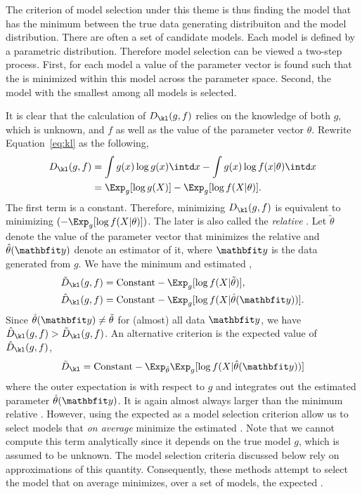The criterion of model selection under this theme is thus finding the model
that has the minimum \kld between the true data generating distribuiton and
the model distribution. There are often a set of candidate models. Each model
is defined by a parametric distribution. Therefore model selection can be
viewed a two-step process. First, for each model a value of the parameter
vector is found such that the \kld is minimized within this model across the
parameter space. Second, the model with the smallest \kld among all models is
selected.

It is clear that the calculation of $D_{\kl}(g,f)$ relies on the knowledge of
both $g$, which is unknown, and $f$ as well as the value of the parameter
vector $\theta$. Rewrite Equation~\eqref{eq:kl} as the following,
\begin{align}
  D_{\kl}(g,f)
  &= \int g(x)\log g(x) \intd x - \int g(x) \log f(x|\theta) \intd x \notag\\
  &= \Exp_g[\log g(X)] - \Exp_g[\log f(X|\theta)].
\end{align}
The first term is a constant. Therefore, minimizing $D_{\kl}(g,f)$ is
equivalent to minimizing $(-\Exp_g[\log f(X|\theta)])$. The later is also
called the \emph{relative} \kldfull. Let $\tilde\theta$ denote the value of
the parameter vector that minimizes the relative \kld and $\hat\theta(\data)$
denote an estimator of it, where $\data$ is the data generated from $g$. We
have the minimum and estimated \kld,
\begin{align}
  \tilde{D}_{\kl}(g,f) &= \text{Constant} - \Exp_g[\log f(X|\tilde\theta)], \\
  \hat{D}_{\kl}(g,f) &= \text{Constant} - \Exp_g[\log f(X|\hat\theta(\data))].
\end{align}
Since $\hat\theta(\data)\ne\tilde\theta$ for (almost) all data $\data$, we
have $\hat{D}_{\kl}(g,f) > \tilde{D}_{\kl}(g,f)$. An alternative criterion is
the expected value of $\hat{D}_{\kl}(g,f)$,
\begin{equation}
  \bar{D}_{\kl} = \text{Constant} -
  \Exp_{\hat\theta}\Exp_g[\log f(X|\hat\theta(\data))]
  \label{eq:expected kl}
\end{equation}
where the outer expectation is with respect to $g$ and integrates out the
estimated parameter $\hat\theta(\data)$. It is again almost always larger than
the minimum relative \kld. However, using the expected \kld as a model
selection criterion allow us to select models that \emph{on average} minimize
the estimated \kld. Note that we cannot compute this term analytically since
it depends on the true model $g$, which is assumed to be unknown. The model
selection criteria discussed below rely on approximations of this quantity.
Consequently, these methods attempt to select the model that on average
minimizes, over a set of models, the expected \kld.

